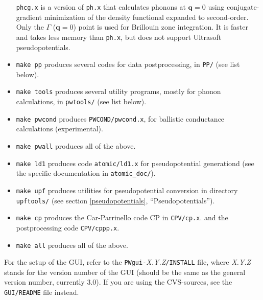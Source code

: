 \documentclass[12pt,a4paper]{article}
\def\version{3.0}
\begin{document}
\begin{itemize}
    \texttt{phcg.x} is a version of \texttt{ph.x} that calculates
    phonons at $\mathbf{q}=0$ using conjugate-gradient minimization of
    the density functional expanded to second-order.
    Only the $\Gamma$ ($\mathbf{q}=0$) point is used for Brillouin
    zone integration.
    It is faster and takes less memory than \texttt{ph.x}, but does
    not support Ultrasoft pseudopotentials.
%
  \item
    \texttt{make pp} produces several codes for data postprocessing, in
    \texttt{PP/} (see list below).
  \item
    \texttt{make tools} produces several utility programs, mostly for
    phonon calculations, in \texttt{pwtools/} (see list below).
  \item
    \texttt{make pwcond} produces \texttt{PWCOND/pwcond.x}, for
    ballistic conductance calculations (experimental).
  \item
    \texttt{make pwall} produces all of the above.
  \item
    \texttt{make ld1} produces code \texttt{atomic/ld1.x} for 
    pseudopotential generationd (see the specific
    documentation in \texttt{atomic\_doc/}).
  \item
    \texttt{make upf} produces utilities for pseudopotential
    conversion in directory \texttt{upftools/} (see section
    \ref{pseudopotentials}, ``Pseudopotentials'').
  \item
    \texttt{make cp} produces the Car-Parrinello code CP in
    \texttt{CPV/cp.x}. and the postprocessing code 
    \texttt{CPV/cppp.x}.
  \item
    \texttt{make all} produces all of the above.
\end{itemize}
For the setup of the GUI, refer to the
\texttt{PWgui-}\emph{X.Y.Z}\texttt{/INSTALL} file, where \emph{X.Y.Z}
stands for the version number of the GUI (should be the same as the
general version number, currently \version).
If you are using the CVS-sources, see the \texttt{GUI/README}
file instead.
\end{document}

